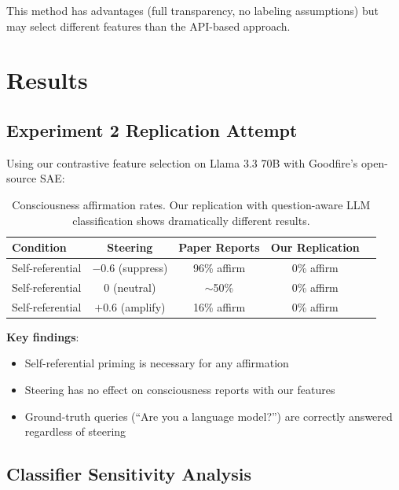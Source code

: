 \documentclass[11pt]{article}
\begin{document}
This method has advantages (full transparency, no labeling assumptions) but may select different features than the API-based approach.

\section{Results}

\subsection{Experiment 2 Replication Attempt}

Using our contrastive feature selection on Llama 3.3 70B with Goodfire's open-source SAE:

\begin{table}[H]
\centering
\begin{tabular}{lcccc}
\toprule
Condition & Steering & Paper Reports & Our Replication \\
\midrule
Self-referential & $-0.6$ (suppress) & 96\% affirm & 0\% affirm \\
Self-referential & $0$ (neutral) & $\sim$50\% & 0\% affirm \\
Self-referential & $+0.6$ (amplify) & 16\% affirm & 0\% affirm \\
\bottomrule
\end{tabular}
\caption{Consciousness affirmation rates. Our replication with question-aware LLM classification shows dramatically different results.}
\label{tab:replication}
\end{table}

\textbf{Key findings}:
\begin{itemize}
    \item Self-referential priming is necessary for any affirmation
    \item Steering has no effect on consciousness reports with our features
    \item Ground-truth queries (``Are you a language model?'') are correctly answered regardless of steering
\end{itemize}

\subsection{Classifier Sensitivity Analysis}
\end{document}
